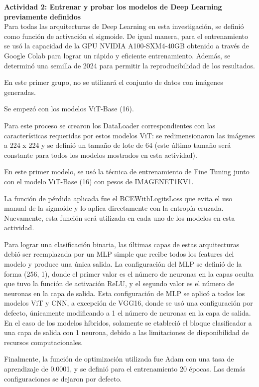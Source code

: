 \textbf{Actividad 2: Entrenar y probar los modelos de Deep Learning previamente definidos}
\\
Para todas las arquitecturas de Deep Learning en esta investigación, se definió como función de activación el sigmoide. De igual manera, para el entrenamiento se usó la capacidad de la GPU NVIDIA A100-SXM4-40GB obtenido a través de Google Colab para lograr un rápido y eficiente entrenamiento. Además, se determinó una semilla de 2024 para permitir la reproducibilidad de los resultados. 

En este primer grupo, no se utilizará el conjunto de datos con imágenes generadas.

Se empezó con los modelos ViT-Base (16).

Para este proceso se crearon los DataLoader correspondientes con las características requeridas por estos modelos ViT: se redimensionaron las imágenes a 224 x 224 y se definió un tamaño de lote de 64 (este último tamaño será constante para todos los modelos mostrados en esta actividad).

En este primer modelo, se usó la técnica de entrenamiento de Fine Tuning junto con el modelo ViT-Base (16) con pesos de IMAGENET1KV1.

La función de pérdida aplicada fue el BCEWithLogitsLoss que evita el uso manual de la sigmoide y lo aplica directamente con la entropía cruzada. Nuevamente, esta función será utilizada en cada uno de los modelos en esta actividad.

Para lograr una clasificación binaria, las últimas capas de estas arquitecturas debió ser reemplazada por un MLP simple que recibe todos los features del modelo y produce una única salida. La configuración del MLP se definió de la forma (256, 1), donde el primer valor es el número de neuronas en la capas oculta que tuvo la función de activación ReLU, y el segundo valor es el número de neuronas en la capa de salida. Esta configuración de MLP se aplicó a todos los modelos ViT y CNN, a excepción de VGG16, donde se usó una configuración por defecto, únicamente modificando a 1 el número de neuronas en la capa de salida. En el caso de los modelos híbridos, solamente se etableció el bloque clasificador a una capa de salida con 1 neurona, debido a las limitaciones de disponibilidad de recursos computacionales.

Finalmente, la función de optimización utilizada fue Adam con una tasa de aprendizaje de 0.0001, y se definió para el entrenamiento 20 épocas. Las demás configuraciones se dejaron por defecto.


